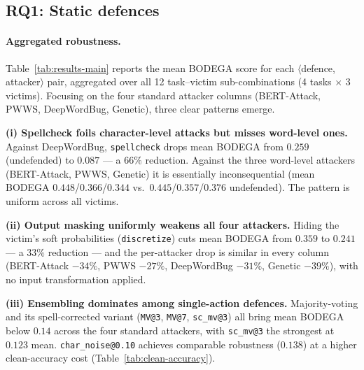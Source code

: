 \documentclass[11pt]{article}
\begin{document}
\subsection{RQ1: Static defences}
\label{sec:results-rq1}

\paragraph{Aggregated robustness.}
Table~\ref{tab:results-main} reports the mean BODEGA score for each $\langle$defence, attacker$\rangle$ pair, aggregated over all 12 task--victim sub-combinations (4 tasks $\times$ 3 victims). Focusing on the four standard attacker columns (BERT-Attack, PWWS, DeepWordBug, Genetic), three clear patterns emerge.

\textbf{(i) Spellcheck foils character-level attacks but misses word-level ones.} Against DeepWordBug, \texttt{spellcheck} drops mean BODEGA from $0.259$ (undefended) to $0.087$ --- a $66\%$ reduction. Against the three word-level attackers (BERT-Attack, PWWS, Genetic) it is essentially inconsequential (mean BODEGA $0.448$/$0.366$/$0.344$ vs.\ $0.445$/$0.357$/$0.376$ undefended). The pattern is uniform across all victims.

\textbf{(ii) Output masking uniformly weakens all four attackers.} Hiding the victim's soft probabilities (\texttt{discretize}) cuts mean BODEGA from $0.359$ to $0.241$ --- a $33\%$ reduction --- and the per-attacker drop is similar in every column (BERT-Attack $-34\%$, PWWS $-27\%$, DeepWordBug $-31\%$, Genetic $-39\%$), with no input transformation applied.

\textbf{(iii) Ensembling dominates among single-action defences.} Majority-voting and its spell-corrected variant (\texttt{MV@3}, \texttt{MV@7}, \texttt{sc\_mv@3}) all bring mean BODEGA below $0.14$ across the four standard attackers, with \texttt{sc\_mv@3} the strongest at $0.123$ mean. \texttt{char\_noise@0.10} achieves comparable robustness ($0.138$) at a higher clean-accuracy cost (Table~\ref{tab:clean-accuracy}).
\end{document}
